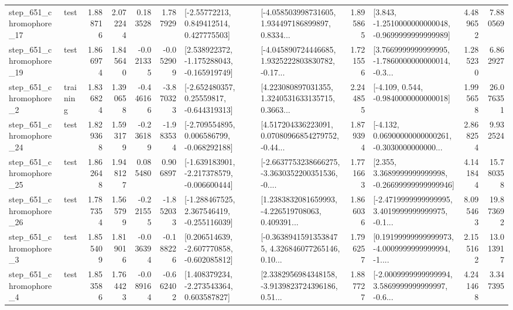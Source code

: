 \begin{tabular}{llrrrrllrlrr}
  step\_651\_chromophore\_17 &      test &      1.888716 &    2.072244 &      0.183528 &  1.787929 &     [-2.55772213, 0.849412514, 0.427775503] &  [-4.058503998731605, 1.934497186899897, 0.8334... &       1.895865 &  [3.843, -1.2510000000000048, -0.9699999999999989] &            4.489652 &          7.880569 \\
  step\_651\_chromophore\_19 &      test &      1.866974 &    1.845640 &     -0.021335 & -0.052909 &   [2.538922372, -1.175288043, -0.165919749] &  [-4.045890724446685, 1.9325222803830782, -0.17... &       1.721556 &  [3.7669999999999995, -1.7860000000000014, -0.3... &            1.285230 &          6.862927 \\
   step\_651\_chromophore\_2 &  training &      1.836824 &    1.390658 &     -0.446166 & -3.870323 &    [-2.652480357, 0.25559817, -0.644319313] &  [4.223080897031355, 1.3240531633135715, 0.3663... &       2.244855 &               [-4.109, 0.544, -0.9840000000000018] &            1.995658 &         26.076351 \\
  step\_651\_chromophore\_24 &      test &      1.829368 &    1.593179 &     -0.236189 & -1.983534 &   [-2.709554895, 0.006586799, -0.068292188] &  [4.517204336223091, 0.07080966854279752, -0.44... &       1.879394 &  [-4.132, 0.06900000000000261, -0.3030000000000... &            2.868254 &          9.932524 \\
  step\_651\_chromophore\_25 &      test &      1.862648 &    1.948127 &      0.085480 &  0.906897 &  [-1.639183901, -2.217378579, -0.006600444] &  [-2.6637753238666275, -3.3630352200351536, -0.... &       1.771663 &  [2.355, 3.3689999999999998, -0.26699999999999946] &            4.141844 &         15.780358 \\
  step\_651\_chromophore\_26 &      test &      1.787354 &    1.565799 &     -0.221555 & -1.852033 &   [-1.288467525, 2.367546419, -0.255116039] &  [1.2383832081659993, -4.226519708063, 0.409391... &       1.866036 &  [-2.4719999999999995, 3.4019999999999975, -0.1... &            8.095463 &         19.873692 \\
   step\_651\_chromophore\_3 &      test &      1.855409 &    1.819016 &     -0.036394 & -0.188226 &   [0.206514639, -2.607770858, -0.602085812] &  [-0.36389415913538475, 4.326846077265146, 0.10... &       1.796257 &  [0.19199999999999973, -4.0009999999999994, -1.... &            2.155162 &         13.013917 \\
   step\_651\_chromophore\_4 &      test &      1.853586 &    1.764423 &     -0.089164 & -0.662402 &    [1.408379234, -2.273543364, 0.603587827] &  [2.3382956984348158, -3.9139823724396186, 0.51... &       1.887727 &  [-2.0009999999999994, 3.5869999999999997, -0.6... &            4.241468 &          3.347395 \\

\end{tabular}
